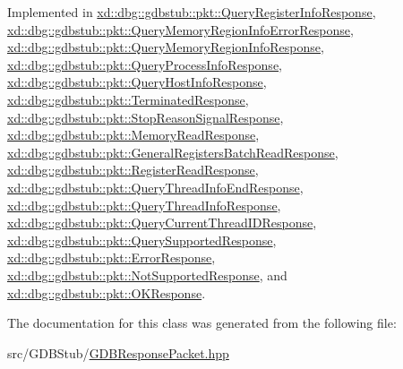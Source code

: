 Implemented in \mbox{\hyperlink{classxd_1_1dbg_1_1gdbstub_1_1pkt_1_1_query_register_info_response_a8457843896d4af60c23846aab4463469}{xd\+::dbg\+::gdbstub\+::pkt\+::\+Query\+Register\+Info\+Response}}, \mbox{\hyperlink{classxd_1_1dbg_1_1gdbstub_1_1pkt_1_1_query_memory_region_info_error_response_af7a4e7c1a1c3a5dd8a1b6e6702101160}{xd\+::dbg\+::gdbstub\+::pkt\+::\+Query\+Memory\+Region\+Info\+Error\+Response}}, \mbox{\hyperlink{classxd_1_1dbg_1_1gdbstub_1_1pkt_1_1_query_memory_region_info_response_a0206002c51a03e5782816ff2f1edbfad}{xd\+::dbg\+::gdbstub\+::pkt\+::\+Query\+Memory\+Region\+Info\+Response}}, \mbox{\hyperlink{classxd_1_1dbg_1_1gdbstub_1_1pkt_1_1_query_process_info_response_a7ef463878fed6534fd3f88b4c3c30b17}{xd\+::dbg\+::gdbstub\+::pkt\+::\+Query\+Process\+Info\+Response}}, \mbox{\hyperlink{classxd_1_1dbg_1_1gdbstub_1_1pkt_1_1_query_host_info_response_abbb6673484d04cacc50302aed62f4ed5}{xd\+::dbg\+::gdbstub\+::pkt\+::\+Query\+Host\+Info\+Response}}, \mbox{\hyperlink{classxd_1_1dbg_1_1gdbstub_1_1pkt_1_1_terminated_response_abf937638e57e626785942dd18b6160a9}{xd\+::dbg\+::gdbstub\+::pkt\+::\+Terminated\+Response}}, \mbox{\hyperlink{classxd_1_1dbg_1_1gdbstub_1_1pkt_1_1_stop_reason_signal_response_a5aa0a7ea7ee15f287165fae5f29c84e8}{xd\+::dbg\+::gdbstub\+::pkt\+::\+Stop\+Reason\+Signal\+Response}}, \mbox{\hyperlink{classxd_1_1dbg_1_1gdbstub_1_1pkt_1_1_memory_read_response_aedaabcefd9d9d5e5182c110f7321be6e}{xd\+::dbg\+::gdbstub\+::pkt\+::\+Memory\+Read\+Response}}, \mbox{\hyperlink{classxd_1_1dbg_1_1gdbstub_1_1pkt_1_1_general_registers_batch_read_response_ad44f1a50fe2b12296f8938d3318e1836}{xd\+::dbg\+::gdbstub\+::pkt\+::\+General\+Registers\+Batch\+Read\+Response}}, \mbox{\hyperlink{classxd_1_1dbg_1_1gdbstub_1_1pkt_1_1_register_read_response_a3eeffab928cc7e45c86656ffe8c53608}{xd\+::dbg\+::gdbstub\+::pkt\+::\+Register\+Read\+Response}}, \mbox{\hyperlink{classxd_1_1dbg_1_1gdbstub_1_1pkt_1_1_query_thread_info_end_response_a04012a6b5db47bee9d27062680a5389b}{xd\+::dbg\+::gdbstub\+::pkt\+::\+Query\+Thread\+Info\+End\+Response}}, \mbox{\hyperlink{classxd_1_1dbg_1_1gdbstub_1_1pkt_1_1_query_thread_info_response_a4c96e3015f3317681ec8ee1e63f78639}{xd\+::dbg\+::gdbstub\+::pkt\+::\+Query\+Thread\+Info\+Response}}, \mbox{\hyperlink{classxd_1_1dbg_1_1gdbstub_1_1pkt_1_1_query_current_thread_i_d_response_a59e75efa133c4c1c8f5e606ea638f012}{xd\+::dbg\+::gdbstub\+::pkt\+::\+Query\+Current\+Thread\+I\+D\+Response}}, \mbox{\hyperlink{classxd_1_1dbg_1_1gdbstub_1_1pkt_1_1_query_supported_response_a31faab3ddafc47625129ae445fbc1b1e}{xd\+::dbg\+::gdbstub\+::pkt\+::\+Query\+Supported\+Response}}, \mbox{\hyperlink{classxd_1_1dbg_1_1gdbstub_1_1pkt_1_1_error_response_aed320a810c6fcf51d67f4d5db4454f61}{xd\+::dbg\+::gdbstub\+::pkt\+::\+Error\+Response}}, \mbox{\hyperlink{classxd_1_1dbg_1_1gdbstub_1_1pkt_1_1_not_supported_response_a4ca25c28620c5d82304d94608c3cbbb0}{xd\+::dbg\+::gdbstub\+::pkt\+::\+Not\+Supported\+Response}}, and \mbox{\hyperlink{classxd_1_1dbg_1_1gdbstub_1_1pkt_1_1_o_k_response_a12f9f11a40f54ab5ade92ba524894d65}{xd\+::dbg\+::gdbstub\+::pkt\+::\+O\+K\+Response}}.



The documentation for this class was generated from the following file\+:\begin{DoxyCompactItemize}
\item 
src/\+G\+D\+B\+Stub/\mbox{\hyperlink{_g_d_b_response_packet_8hpp}{G\+D\+B\+Response\+Packet.\+hpp}}\end{DoxyCompactItemize}

